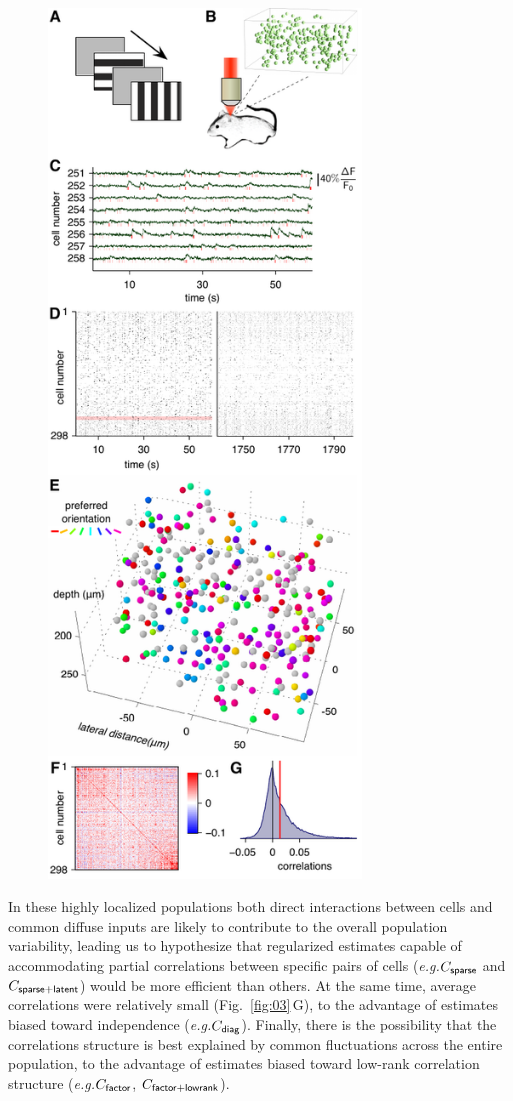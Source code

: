 \documentclass[10pt]{article}
\begin{document}
\begin{figure}
    {\includegraphics[width=8.3cm]{figures/Figure03.pdf}}
\end{figure}

In these highly localized populations both direct interactions between cells and common diffuse inputs are likely to contribute to the overall population variability, leading us to hypothesize that regularized estimates capable of accommodating partial correlations between specific pairs of cells (\emph{e.g.}\;$C_{\sf sparse}$ and $C_{\sf sparse+latent}$) would be more efficient than others. At the same time, average correlations were relatively small (Fig.~\ref{fig:03}\,G), to the advantage of estimates biased toward independence (\emph{e.g.}\;$C_{\sf diag}$). Finally, there is the possibility that the correlations structure is best explained by common fluctuations across the entire population, to the advantage of estimates biased toward low-rank correlation structure (\emph{e.g.}\;$C_{\sf factor}$, $C_{\sf factor+lowrank}$).
\end{document}
